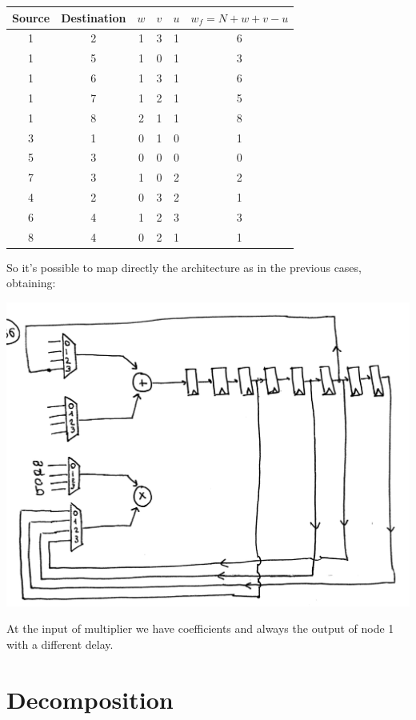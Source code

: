 \begin{center}
  \begin{tabular}{|c|c|c|c|c|c|}
    \hline
    Source &  Destination&  $w$ & $v$&  $u$&  $w_f=N+w+v-u$\\
    \hline
      1&      2&      1&    3&    1&    6\\
      1&      5&      1&    0&    1&    3\\
      1&      6&      1&    3&    1&    6\\
      1&      7&      1&    2&    1&    5\\
      1&      8&      2&    1&    1&    8\\
      \hline
      3&      1&      0&    1&    0&    1\\
      5&      3&      0&    0&    0&    0\\
      7&      3&      1&    0&    2&    2\\
      4&      2&      0&    3&    2&    1\\
      6&      4&      1&    2&    3&    3\\
      8&      4&      0&    2&    1&    1\\
    \hline
  \end{tabular}
\end{center}

So it's possible to map directly the architecture as in the previous cases, obtaining:

\begin{center}
  \includegraphics[width=0.7\linewidth]{img/img1/36}
\end{center}

At the input of multiplier we have coefficients and always the output of node 1 with a different delay.

\section{Decomposition}

